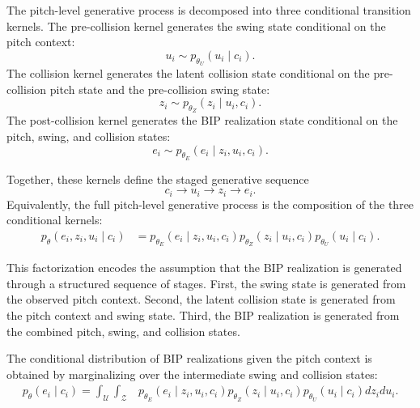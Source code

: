 \documentclass[11pt]{article}
\begin{document}
The pitch-level generative process is decomposed into three conditional transition kernels. The pre-collision kernel generates the swing state conditional on the pitch context:
\begin{equation}
u_i \sim p_{\theta_U}(u_i \mid c_i).
\end{equation}
The collision kernel generates the latent collision state conditional on the pre-collision pitch state and the pre-collision swing state:
\begin{equation}
z_i \sim p_{\theta_Z}(z_i \mid u_i,c_i).
\end{equation}
The post-collision kernel generates the BIP realization state conditional on the pitch, swing, and collision states:
\begin{equation}
e_i \sim p_{\theta_E}(e_i \mid z_i,u_i,c_i).
\end{equation}

Together, these kernels define the staged generative sequence
\begin{equation}
c_i
\longrightarrow
u_i
\longrightarrow
z_i
\longrightarrow
e_i.
\end{equation}
Equivalently, the full pitch-level generative process is the composition of the three conditional kernels:
\begin{equation}
\begin{aligned}
p_{\theta}(e_i,z_i,u_i \mid c_i)
&=
p_{\theta_E}(e_i \mid z_i,u_i,c_i)
p_{\theta_Z}(z_i \mid u_i,c_i)
p_{\theta_U}(u_i \mid c_i).
\end{aligned}
\end{equation}

This factorization encodes the assumption that the BIP realization is generated through a structured sequence of stages. First, the swing state is generated from the observed pitch context. Second, the latent collision state is generated from the pitch context and swing state. Third, the BIP realization is generated from the combined pitch, swing, and collision states.

The conditional distribution of BIP realizations given the pitch context is obtained by marginalizing over the intermediate swing and collision states:
\begin{equation}
\begin{aligned}
p_{\theta}(e_i \mid c_i)
=
\int_{\mathcal{U}}
\int_{\mathcal{Z}}
&p_{\theta_E}(e_i \mid z_i,u_i,c_i)
p_{\theta_Z}(z_i \mid u_i,c_i) 
p_{\theta_U}(u_i \mid c_i)
dz_i du_i.
\end{aligned}
\end{equation}
\end{document}
